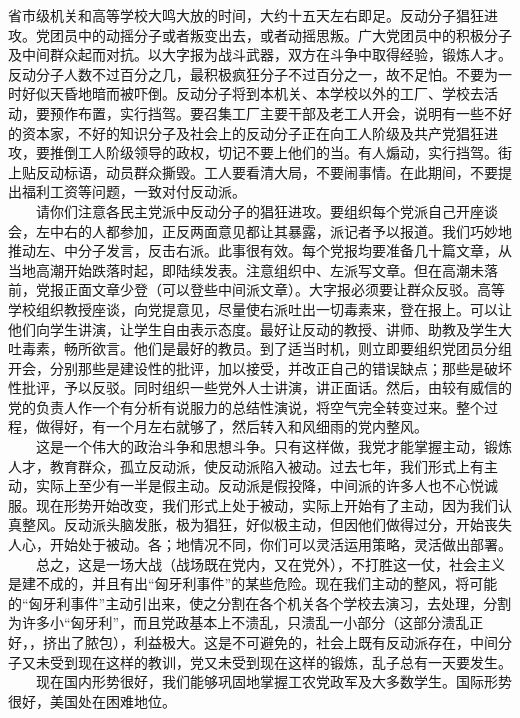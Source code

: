 \documentclass[cn,11pt,chinese]{elegantbook}
\begin{document}
省市级机关和高等学校大鸣大放的时间，大约十五天左右即足。反动分子猖狂进攻。党团员中的动摇分子或者叛变出去，或者动摇思叛。广大党团员中的积极分子及中间群众起而对抗。以大字报为战斗武器，双方在斗争中取得经验，锻炼人才。反动分子人数不过百分之几，最积极疯狂分子不过百分之一，故不足怕。不要为一时好似天昏地暗而被吓倒。反动分子将到本机关、本学校以外的工厂、学校去活动，要预作布置，实行挡驾。要召集工厂主要干部及老工人开会，说明有一些不好的资本家，不好的知识分子及社会上的反动分子正在向工人阶级及共产党猖狂进攻，要推倒工人阶级领导的政权，切记不要上他们的当。有人煽动，实行挡驾。街上贴反动标语，动员群众撕毁。工人要看清大局，不要闹事情。在此期间，不要提出福利工资等问题，一致对付反动派。\\
　　请你们注意各民主党派中反动分子的猖狂进攻。要组织每个党派自己开座谈会，左中右的人都参加，正反两面意见都让其暴露，派记者予以报道。我们巧妙地推动左、中分子发言，反击右派。此事很有效。每个党报均要准备几十篇文章，从当地高潮开始跌落时起，即陆续发表。注意组织中、左派写文章。但在高潮未落前，党报正面文章少登（可以登些中间派文章）。大字报必须要让群众反驳。高等学校组织教授座谈，向党提意见，尽量使右派吐出一切毒素来，登在报上。可以让他们向学生讲演，让学生自由表示态度。最好让反动的教授、讲师、助教及学生大吐毒素，畅所欲言。他们是最好的教员。到了适当时机，则立即要组织党团员分组开会，分别那些是建设性的批评，加以接受，并改正自己的错误缺点；那些是破坏性批评，予以反驳。同时组织一些党外人士讲演，讲正面话。然后，由较有威信的党的负责人作一个有分析有说服力的总结性演说，将空气完全转变过来。整个过程，做得好，有一个月左右就够了，然后转入和风细雨的党内整风。\\
　　这是一个伟大的政治斗争和思想斗争。只有这样做，我党才能掌握主动，锻炼人才，教育群众，孤立反动派，使反动派陷入被动。过去七年，我们形式上有主动，实际上至少有一半是假主动。反动派是假投降，中间派的许多人也不心悦诚服。现在形势开始改变，我们形式上处于被动，实际上开始有了主动，因为我们认真整风。反动派头脑发胀，极为猖狂，好似极主动，但因他们做得过分，开始丧失人心，开始处于被动。各；地情况不同，你们可以灵活运用策略，灵活做出部署。\\
　　总之，这是一场大战（战场既在党内，又在党外），不打胜这一仗，社会主义是建不成的，并且有出“匈牙利事件”的某些危险。现在我们主动的整风，将可能的“匈牙利事件”主动引出来，使之分割在各个机关各个学校去演习，去处理，分割为许多小“匈牙利”，而且党政基本上不溃乱，只溃乱一小部分（这部分溃乱正好，，挤出了脓包），利益极大。这是不可避免的，社会上既有反动派存在，中间分子又未受到现在这样的教训，党又未受到现在这样的锻炼，乱子总有一天要发生。\\
　　现在国内形势很好，我们能够巩固地掌握工农党政军及大多数学生。国际形势很好，美国处在困难地位。\\
\end{document}
